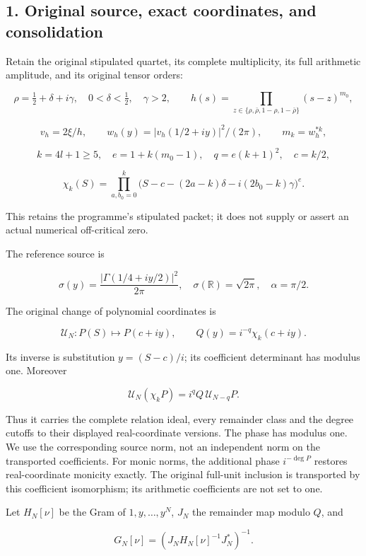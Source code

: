 \subsection{1. Original source, exact coordinates, and consolidation}\label{loc:original-source-exact-coordinates-and-consolidation}

Retain the original stipulated quartet, its complete multiplicity, its full arithmetic amplitude, and its original tensor orders:

\[
\rho=\tfrac12+\delta+i\gamma,\quad 0<\delta<\tfrac12,\quad\gamma>2,
\qquad h(s)=\prod_{z\in\{\rho,\bar\rho,1-\rho,1-\bar\rho\}}(s-z)^{m_0},
\]

\[
v_h=2\xi/h,\qquad w_h(y)=|v_h(1/2+iy)|^2/(2\pi),\qquad m_k=w_h^{*k},
\]

\[
k=4l+1\ge5,\quad e=1+k(m_0-1),\quad q=e(k+1)^2,\quad c=k/2,
\]

\[
\chi_k(S)=\prod_{a,b_0=0}^k
\bigl(S-c-(2a-k)\delta-i(2b_0-k)\gamma\bigr)^e.
\]

This retains the programme's stipulated packet; it does not supply or assert an actual numerical off-critical zero.

The reference source is

\[
\sigma(y)=\frac{|\Gamma(1/4+iy/2)|^2}{2\pi},\quad
\sigma(\mathbb R)=\sqrt{2\pi},\quad\alpha=\pi/2.
\]

The original change of polynomial coordinates is

\[
\mathcal U_N:P(S)\longmapsto P(c+iy),\qquad
Q(y)=i^{-q}\chi_k(c+iy).
\tag{C1}
\]

Its inverse is substitution \(y=(S-c)/i\); its coefficient determinant has modulus one. Moreover

\[
\mathcal U_N(\chi_kP)=i^q Q\,\mathcal U_{N-q}P.
\]

Thus it carries the complete relation ideal, every remainder class and the degree cutoffs to their displayed real-coordinate versions. The phase has modulus one. We use the corresponding source norm, not an independent norm on the transported coefficients. For monic norms, the additional phase \(i^{-\deg P}\) restores real-coordinate monicity exactly. The original full-unit inclusion is transported by this coefficient isomorphism; its arithmetic coefficients are not set to one.

Let \(H_N[\nu]\) be the Gram of \(1,y,\ldots,y^N\), \(J_N\) the remainder map modulo \(Q\), and

\[
G_N[\nu]=(J_NH_N[\nu]^{-1}J_N^*)^{-1}.
\]

